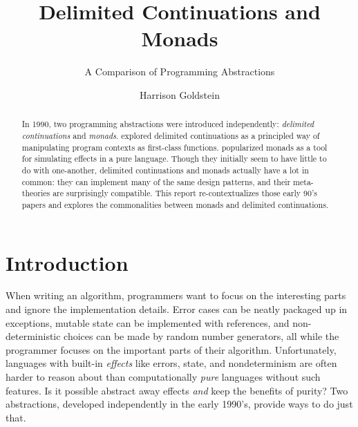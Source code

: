 \documentclass[acmsmall, nonacm, screen]{acmart}
\begin{document}
\title{Delimited Continuations and Monads}
\subtitle{A Comparison of Programming Abstractions}

\author{Harrison Goldstein}

\renewcommand{\shortauthors}{Goldstein}

\begin{abstract}
  In 1990, two programming abstractions were introduced independently: {\em delimited
  continuations} and {\em monads}. \citet{danvy1990abstracting} explored delimited continuations
  as a principled way of manipulating program contexts as first-class functions.
  \citet{wadler1990comprehending} popularized monads as a tool for simulating effects in a pure
  language. Though they initially seem to have little to do with one-another, delimited
  continuations and monads actually have a lot in common: they can implement many of the same
  design patterns, and their meta-theories are surprisingly compatible. This report
  re-contextualizes those early 90's papers and explores the commonalities between monads and
  delimited continuations.
\end{abstract}

\maketitle

\section{Introduction} \label{sec:introduction}
When writing an algorithm, programmers want to focus on the interesting parts and ignore the
implementation details. Error cases can be neatly packaged up in exceptions, mutable state can be
implemented with references, and non-deterministic choices can be made by random number
generators, all while the programmer focuses on the important parts of their algorithm.
Unfortunately, languages with built-in {\em effects} like errors, state, and nondeterminism are
often harder to reason about than computationally {\em pure} languages without such features. Is
it possible abstract away effects {\em and} keep the benefits of purity? Two abstractions, developed
independently in the early 1990's, provide ways to do just that.
\end{document}
